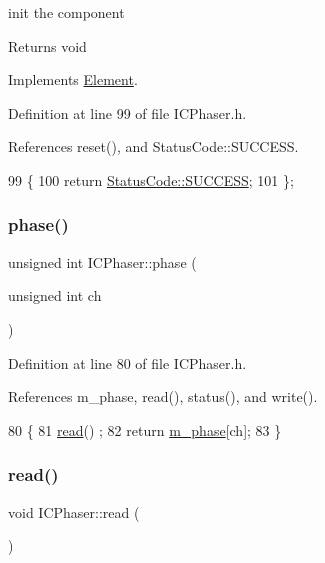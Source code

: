 init the component

\begin{DoxyReturn}{Returns}
void 
\end{DoxyReturn}


Implements \hyperlink{classElement_af42754b5cabc198869222725218d695c}{Element}.



Definition at line 99 of file I\+C\+Phaser.\+h.



References reset(), and Status\+Code\+::\+S\+U\+C\+C\+E\+SS.


\begin{DoxyCode}
99                     \{
100     \textcolor{keywordflow}{return} \hyperlink{classStatusCode_a6f565cbeadc76d14c72f047e5e85eb4badd0da38d3ba0d922efd1f4619bc37ad8}{StatusCode::SUCCESS};
101   \};
\end{DoxyCode}
\mbox{\label{classICPhaser_a1aa92666783d3b77ef73f2c6ef41f419}} 
\subsubsection{\texorpdfstring{phase()}{phase()}}
{\footnotesize\ttfamily unsigned int I\+C\+Phaser\+::phase (\begin{DoxyParamCaption}\item[{unsigned int}]{ch }\end{DoxyParamCaption})\hspace{0.3cm}{\ttfamily [inline]}}



Definition at line 80 of file I\+C\+Phaser.\+h.



References m\+\_\+phase, read(), status(), and write().


\begin{DoxyCode}
80                                      \{
81     \hyperlink{classICPhaser_a79170c0639b8bcedd267a99a1857c9a7}{read}() ;
82     \textcolor{keywordflow}{return} \hyperlink{classICPhaser_afe2a4527d58d08342d631dfa7c731203}{m\_phase}[ch];
83   \}
\end{DoxyCode}
\mbox{\label{classICPhaser_a79170c0639b8bcedd267a99a1857c9a7}} 
\subsubsection{\texorpdfstring{read()}{read()}}
{\footnotesize\ttfamily void I\+C\+Phaser\+::read (\begin{DoxyParamCaption}{ }\end{DoxyParamCaption})}



